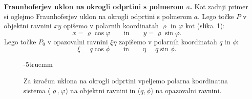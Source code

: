 \begin{example}{\bf Fraunhoferjev uklon na okrogli odprtini s polmerom $a$.}
Kot zadnji primer si oglejmo Fraunhoferjev uklon na okrogli odprtini s polmerom $a$. 
Lego točke $P$ v objektni ravnini $xy$ opišemo v polarnih koordinatah $\varrho$ in $\varphi$
kot (slika~\ref{fig:05_koordinate_circ}):
\begin{equation}
x = \varrho \cos \varphi \qquad \mathrm{in} \qquad y = \varrho \sin \varphi. 
\label{eq:05_30}
\end{equation}
Lego točke $P_0$ v opazovalni ravnini $\xi \eta$ zapišemo v polarnih koordinatah 
$q$ in $\phi$:
\begin{equation}
\xi = q \cos \phi \qquad \mathrm{in} \qquad \eta = q \sin \phi. 
\label{eq:05_31}
\end{equation}
\begin{figure}[ht]
\vglue-5truemm
\centering
\def\svgwidth{130truemm} 

\caption{Za izračun uklona na okrogli odprtini vpeljemo polarna koordinatna sistema 
($\varrho, \varphi$) na objektni ravnini in ($q, \phi$) na opazovalni ravnini.}
\label{fig:05_koordinate_circ}
\end{figure}


\end{example}
